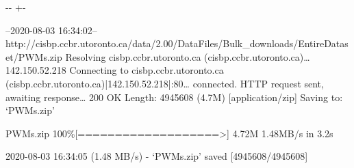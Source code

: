 \documentclass[letterpaper,10pt,english]{sphinxmanual}
\newlength\nbsphinxcodecellspacing
\begin{document}
{

\kern-\sphinxverbatimsmallskipamount\kern-\baselineskip
\kern+\FrameHeightAdjust\kern-\fboxrule
\vspace{\nbsphinxcodecellspacing}

\begin{sphinxVerbatim}[commandchars=\\\{\}]
--2020-08-03 16:34:02--  http://cisbp.ccbr.utoronto.ca/data/2.00/DataFiles/Bulk\_downloads/EntireDataset/PWMs.zip
Resolving cisbp.ccbr.utoronto.ca (cisbp.ccbr.utoronto.ca){\ldots} 142.150.52.218
Connecting to cisbp.ccbr.utoronto.ca (cisbp.ccbr.utoronto.ca)|142.150.52.218|:80{\ldots} connected.
HTTP request sent, awaiting response{\ldots} 200 OK
Length: 4945608 (4.7M) [application/zip]
Saving to: ‘PWMs.zip’

PWMs.zip            100\%[===================>]   4.72M  1.48MB/s    in 3.2s

2020-08-03 16:34:05 (1.48 MB/s) - ‘PWMs.zip’ saved [4945608/4945608]


\end{sphinxVerbatim}}
\end{document}
